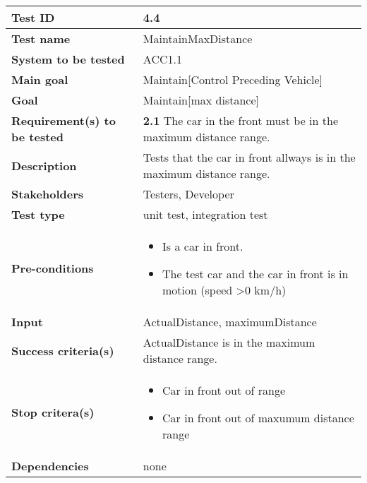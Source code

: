 		\begin{table}[H]
		\begin{tabular}{| p{4cm} | p{10cm} |}
			\hline
			\rowcolor{gray}
			{\bf Test ID} & 4.4 \\ \hline
			{\bf Test name} & MaintainMaxDistance \\ \hline
			{\bf System to be tested} & ACC1.1\\ \hline
			{\bf Main goal} & Maintain[Control Preceding Vehicle] \\ \hline
			{\bf Goal} & Maintain[max distance] \\ \hline
			{\bf Requirement(s) to be tested} & {\bf 2.1} The car in the front must be in 
			the maximum distance range. \\ \hline
			{\bf Description} & Tests that the car in front allways is in the maximum 
			distance range. \\ \hline
			{\bf Stakeholders} & Testers, Developer \\ \hline
			{\bf Test type} & unit test, integration test \\ \hline
			{\bf Pre-conditions} & 
				\begin{itemize}
					\item Is a car in front.
					\item The test car and the car in front is in motion (speed \textgreater 0 km/h)
				\end{itemize} \\ \hline
			{\bf Input} & ActualDistance, maximumDistance \\ \hline
			{\bf Success criteria(s)} & ActualDistance is in the maximum distance range. \\ \hline
			{\bf Stop critera(s)} &  
				\begin{itemize}
					\item Car in front out of range
					\item Car in front out of maxumum distance range
				\end{itemize}\\ \hline
			{\bf Dependencies} & none\\ \hline
		\end{tabular}
	\end{table}

